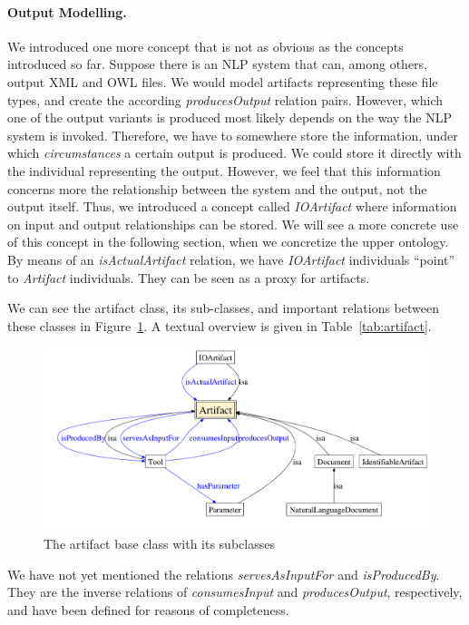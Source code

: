 \paragraph{Output Modelling.} We introduced one more concept that is
not as obvious as the concepts introduced so far. Suppose there is an
NLP system that can, among others, output XML and OWL files. We would
model artifacts representing these file types, and create the
according \emph{producesOutput} relation pairs. However, which one of
the output variants is produced most likely depends on the way the
NLP system is invoked. Therefore, we have to somewhere store the
information, under which \emph{circumstances} a certain output is
produced. We could store it directly with the individual representing
the output. However, we feel that this information concerns more the
relationship between the system and the output, not the output
itself. Thus, we introduced a concept called \emph{IOArtifact} where
information on input and output relationships can be stored. We will
see a more concrete use of this concept in the following section, when
we concretize the upper ontology. By means of an
\emph{isActualArtifact} relation, we have \emph{IOArtifact}
individuals ``point'' to \emph{Artifact} individuals. They can be seen
as a proxy for artifacts.

We can see the artifact class, its sub-classes, and important
relations between these classes in Figure~\ref{fig:artifact}. A
textual overview is given in Table~\ref{tab:artifact}.
 
\begin{figure}[htb]
  \centering
  \includegraphics[width=1.0\textwidth]{pictures/artifact.pdf}
  \caption{The artifact base class with its subclasses}
  \label{fig:artifact}
\end{figure}



We have not yet mentioned the relations \emph{servesAsInputFor} and
\emph{isProducedBy}. They are the inverse relations of
\emph{consumesInput} and \emph{producesOutput}, respectively, and have
been defined for reasons of completeness.




